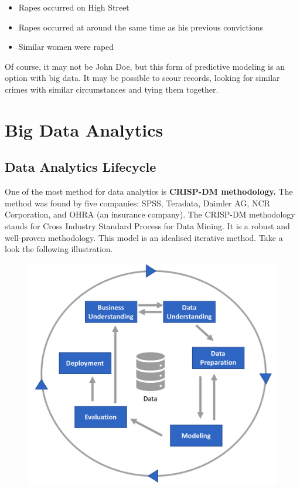 \documentclass[]{book}
\providecommand{\tightlist}{%
  \setlength{\itemsep}{0pt}\setlength{\parskip}{0pt}}
\begin{document}
\begin{itemize}
\tightlist
\item
  Rapes occurred on High Street
\item
  Rapes occurred at around the same time as his previous convictions
\item
  Similar women were raped
\end{itemize}

Of course, it may not be John Doe, but this form of predictive modeling
is an option with big data. It may be possible to scour records, looking
for similar crimes with similar circumstances and tying them together.

\chapter{Big Data Analytics}\label{big-data-analytics}

\section{Data Analytics Lifecycle}\label{data-analytics-lifecycle}

One of the most method for data analytics is \textbf{CRISP-DM
methodology. } The method was found by five companies: SPSS, Teradata,
Daimler AG, NCR Corporation, and OHRA (an insurance company). The
CRISP-DM methodology stands for Cross Industry Standard Process for Data
Mining. It is a robust and well-proven methodology. This model is an
idealised iterative method. Take a look the following illustration.

\begin{figure}
\centering
\includegraphics{dm.PNG}
\caption{}
\end{figure}
\end{document}

